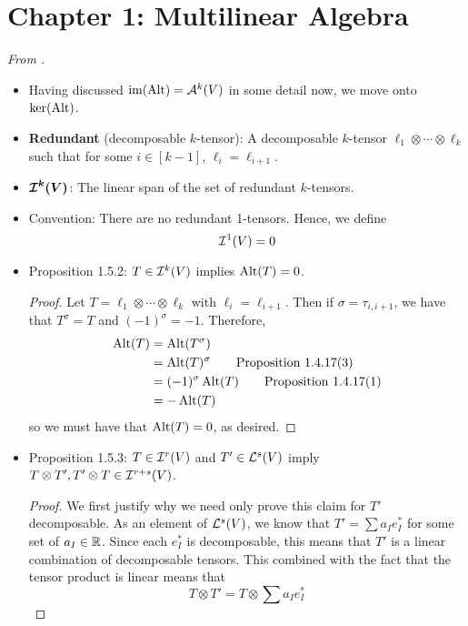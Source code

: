 \documentclass[../notes.tex]{subfiles}
\begin{document}
\section{Chapter 1: Multilinear Algebra}
\emph{From \textcite{bib:DifferentialForms}.}
\begin{itemize}
    \item {}Having discussed $\im(\Alt)=\alt[k]{V}$ in some detail now, we move onto $\ker(\Alt)$.
    \item \textbf{Redundant} (decomposable $k$-tensor): A decomposable $k$-tensor $\ell_1\otimes\cdots\otimes\ell_k$ such that for some $i\in[k-1]$, $\ell_i=\ell_{i+1}$.
    \item $\bm{\ide[k]{V}}$: The linear span of the set of redundant $k$-tensors.
    \item Convention: There are no redundant 1-tensors. Hence, we define
    \begin{equation*}
        \ide[1]{V} = 0
    \end{equation*}
    \item Proposition 1.5.2: $T\in\ide[k]{V}$ implies $\Alt(T)=0$.
    \begin{proof}
        Let $T=\ell_1\otimes\cdots\otimes\ell_k$ with $\ell_i=\ell_{i+1}$. Then if $\sigma=\tau_{i,i+1}$, we have that $T^\sigma=T$ and $(-1)^\sigma=-1$. Therefore,
        \begin{align*}
            \Alt(T) &= \Alt(T^\sigma)\\
            &= \Alt(T)^\sigma\tag*{Proposition 1.4.17(3)}\\
            &= (-1)^\sigma\Alt(T)\tag*{Proposition 1.4.17(1)}\\
            &= -\Alt(T)
        \end{align*}
        so we must have that $\Alt(T)=0$, as desired.
    \end{proof}
    \item Proposition 1.5.3: $T\in\ide[r]{V}$ and $T'\in\lin[s]{V}$ imply $T\otimes T',T'\otimes T\in\ide[r+s]{V}$.
    \begin{proof}
        We first justify why we need only prove this claim for $T'$ decomposable. As an element of $\lin[s]{V}$, we know that $T'=\sum a_Ie_I^*$ for some set of $a_I\in\R$. Since each $e_I^*$ is decomposable, this means that $T'$ is a linear combination of decomposable tensors. This combined with the fact that the tensor product is linear means that
        \begin{equation*}
            T\otimes T' = T\otimes\sum a_Ie_I^*

\end{equation*}
\end{proof}
\end{itemize}
\end{document}
